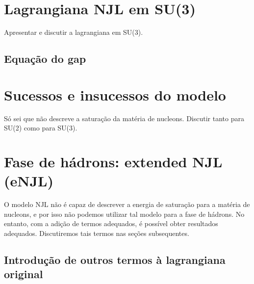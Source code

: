 \section{Lagrangiana NJL em SU(3)}

Apresentar e discutir a lagrangiana em SU(3).

\subsection{Equação do gap}

\section{Sucessos e insucessos do modelo}

Só sei que não descreve a saturação da matéria de nucleons. Discutir tanto para SU(2) como para SU(3).

\section{Fase de hádrons: extended NJL (eNJL)}

O modelo NJL não é capaz de descrever a energia de saturação para a matéria de nucleons, e por isso não podemos utilizar tal modelo para a fase de hádrons. No entanto, com a adição de termos adequados, é possível obter resultados adequados. Discutiremos tais termos nas seções subsequentes.

\subsection{Introdução de outros termos à lagrangiana original}
\label{Sec:Introducao_termos_lag_NJL}

